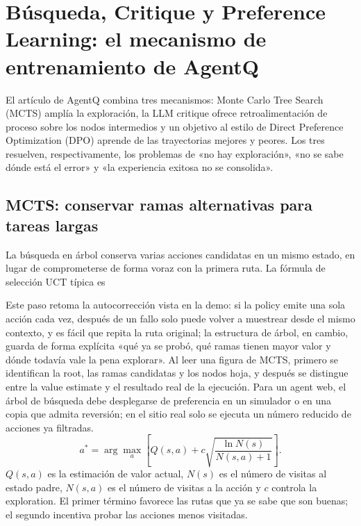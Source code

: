 \section{Búsqueda, Critique y Preference Learning: el mecanismo de entrenamiento de AgentQ}

El artículo de AgentQ combina tres mecanismos: Monte Carlo Tree Search (MCTS) amplía la exploración, la LLM critique ofrece retroalimentación de proceso sobre los nodos intermedios y un objetivo al estilo de Direct Preference Optimization (DPO) aprende de las trayectorias mejores y peores. Los tres resuelven, respectivamente, los problemas de «no hay exploración», «no se sabe dónde está el error» y «la experiencia exitosa no se consolida».


\subsection{MCTS: conservar ramas alternativas para tareas largas}

La búsqueda en árbol conserva varias acciones candidatas en un mismo estado, en lugar de comprometerse de forma voraz con la primera ruta. La fórmula de selección UCT típica es

Este paso retoma la autocorrección vista en la demo: si la policy emite una sola acción cada vez, después de un fallo solo puede volver a muestrear desde el mismo contexto, y es fácil que repita la ruta original; la estructura de árbol, en cambio, guarda de forma explícita «qué ya se probó, qué ramas tienen mayor valor y dónde todavía vale la pena explorar». Al leer una figura de MCTS, primero se identifican la root, las ramas candidatas y los nodos hoja, y después se distingue entre la value estimate y el resultado real de la ejecución. Para un agent web, el árbol de búsqueda debe desplegarse de preferencia en un simulador o en una copia que admita reversión; en el sitio real solo se ejecuta un número reducido de acciones ya filtradas.
\[
a^*=\arg\max_a\left[Q(s,a)+c\sqrt{\frac{\ln N(s)}{N(s,a)+1}}\right].
\]
$Q(s,a)$ es la estimación de valor actual, $N(s)$ es el número de visitas al estado padre, $N(s,a)$ es el número de visitas a la acción y $c$ controla la exploration. El primer término favorece las rutas que ya se sabe que son buenas; el segundo incentiva probar las acciones menos visitadas.

